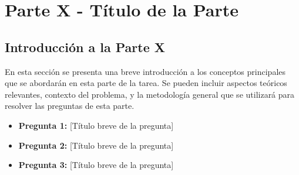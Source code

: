 \section{Parte X - Título de la Parte}
\label{sec:parteX}

\begin{center}
\end{center}

\vspace{1cm}

\subsection*{Introducción a la Parte X}
En esta sección se presenta una breve introducción a los conceptos principales que se abordarán en esta parte de la tarea.
Se pueden incluir aspectos teóricos relevantes, contexto del problema, y la metodología general que se utilizará para resolver
las preguntas de esta parte.

\begin{itemize}
    \item \textbf{Pregunta 1:} [Título breve de la pregunta]
    \item \textbf{Pregunta 2:} [Título breve de la pregunta]
    \item \textbf{Pregunta 3:} [Título breve de la pregunta]
\end{itemize}





